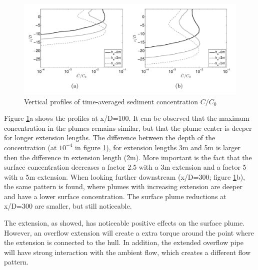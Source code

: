 \begin{figure}[ht!]
    \centering
    \includegraphics[width = 1\textwidth]{Images/Overflow_extension_belg_2.png}
    \caption{Vertical profiles of time-averaged sediment concentration $C/C_0$}
    \label{fig:Overflow_extension_belg_2}
\end{figure}

\noindent Figure \ref{fig:Overflow_extension_belg_2}a shows the profiles at x/D=100. It can be observed that the maximum concentration in the plumes remains similar, but that the plume center is deeper for longer extension lengths. The difference between the depth of the concentration (at $10^{-4}$ in figure \ref{fig:Overflow_extension_belg_2}), for extension lengths 3m and 5m is larger then the difference in extension length (2m). More important is the fact that the surface concentration decreases a factor 2.5 with a 3m extension and a factor 5 with a 5m extension. When looking further downstream (x/D=300; figure \ref{fig:Overflow_extension_belg_2}b), the same pattern is found, where plumes with increasing extension are deeper and have a lower surface concentration. The surface plume reductions at x/D=300 are smaller, but still noticeable. \newline

\noindent The extension, as showed, has noticeable positive effects on the surface plume. However, an overflow extension will create a extra torque around the point where the extension is connected to the hull. In addition, the extended overflow pipe will have strong interaction with the ambient flow, which creates a different flow pattern. 








